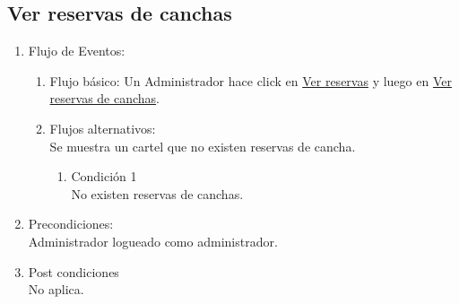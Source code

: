 \documentclass[a4paper,11pt]{article}
\begin{document}
\subsection{Ver reservas de canchas}
\begin{enumerate}


    \begin{enumerate}
    \item Descripción breve: \\
        Se listan las reservas de canchas.
    \item Actores \\
        Administrador.
    \item Disparadores: \\
        Click en el botón \underline{Ver reservas de canchas}
        dentro de la página principal del administrador.
    \end{enumerate}

    \item Flujo de Eventos: 

    \begin{enumerate}

        \item Flujo básico:
            Un Administrador hace click en \underline{Ver reservas} y luego
            en \underline{Ver reservas de canchas}.
        \item Flujos alternativos:\\
            Se muestra un cartel que no existen reservas de cancha.
            \begin{enumerate}
                \item Condición 1 \\
                    No existen reservas de canchas.
            \end{enumerate}

    \end{enumerate}

    \item Precondiciones: \\
        Administrador logueado como administrador.

    \item Post condiciones \\
        No aplica.

\end{enumerate}
\end{document}
